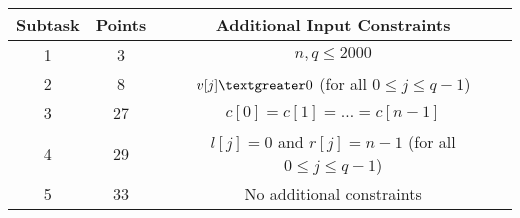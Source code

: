 \newcommand{\gt}{\textgreater} 
\newcommand{\lt}{\textless} 

\begin{center}
\renewcommand{\arraystretch}{1.5}
\begin{tabular}{|c|c|c|}
\hline
Subtask & Points & Additional Input Constraints\\
\hline
1 & 3 & $n, q \leq 2000$ \\
\hline
2 & 8 & $v[j] \gt 0$ (for all $0 \leq j \leq q-1$) \\
\hline
3 & 27 & $c[0] = c[1] = \ldots = c[n-1]$ \\
\hline
4 & 29 & $l[j] = 0$ and $r[j] = n-1$  (for all $0 \leq j \leq q-1$) \\
\hline
5 & 33 & No additional constraints \\
\hline
\end{tabular}
\end{center}